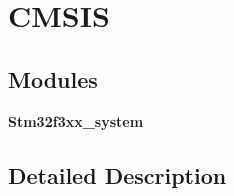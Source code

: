 \section{C\+M\+S\+IS}
\label{group___c_m_s_i_s}
\subsection*{Modules}
\begin{DoxyCompactItemize}
\item 
\textbf{ Stm32f3xx\+\_\+system}
\end{DoxyCompactItemize}


\subsection{Detailed Description}
